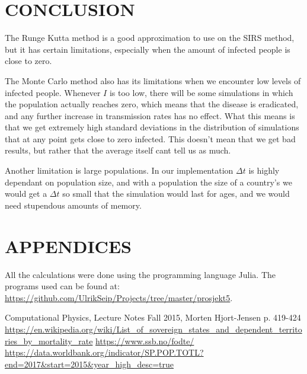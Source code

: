 \documentclass[a4paper]{article}
\let\Oldsection\section
\renewcommand{\section}{\FloatBarrier\Oldsection}
\begin{document}
	\section{CONCLUSION}
	
	The Runge Kutta method is a good approximation to use on the SIRS method, but it has certain limitations, especially when the amount of infected people is close to zero. 
	
	The Monte Carlo method also has its limitations when we encounter low levels of infected people. Whenever $I$ is too low, there will be some simulations in which the population actually reaches zero, which means that the disease is eradicated, and any further increase in transmission rates has no effect. What this means is that we get extremely high standard deviations in the distribution of simulations that at any point gets close to zero infected. This doesn't mean that we get bad results, but rather that the average itself cant tell us as much.
	
	Another limitation is large populations. In our implementation $\Delta t$ is highly dependant on population size, and with a population the size of a country's we would get a $\Delta t$ so small that the simulation would last for ages, and we would need stupendous amounts of memory. 
	
	\section{APPENDICES}
	All the calculations were done using the programming language Julia. The programs used can be found at:
	\url{https://github.com/UlrikSeip/Projects/tree/master/prosjekt5}.
	
	\begin{thebibliography}{9}
		Computational Physics, Lecture Notes Fall 2015, Morten Hjort-Jensen p. 419-424
		\url{https://en.wikipedia.org/wiki/List_of_sovereign_states_and_dependent_territories_by_mortality_rate}
		\url{https://www.ssb.no/fodte/}
		\url{https://data.worldbank.org/indicator/SP.POP.TOTL?end=2017&start=2015&year_high_desc=true}
	\end{thebibliography}
	
	
	
\end{document}
